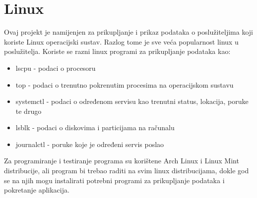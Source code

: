 \documentclass[zavrsnirad]{fer}
\begin{document}
\section{Linux}
Ovaj projekt je namijenjen za prikupljanje i prikaz podataka o poslužiteljima koji koriste Linux operacijski sustav. Razlog tome je sve veća popularnost linux u poslužitelja.
Koriste se razni linux programi za prikupljanje podataka kao:
\begin{itemize}
	\item  lscpu - podaci o procesoru
	\item top - podaci o trenutno pokrenutim procesima na operacijskom sustavu
	\item systemctl - podaci o određenom servisu kao trenutni status, lokacija, poruke te drugo
	\item lsblk -  podaci o diskovima i particijama na računalu
	\item journalctl - poruke koje je određeni servis poslao
\end{itemize}
Za programiranje i testiranje programa su korištene Arch Linux i Linux Mint distribucije, ali program bi trebao raditi na svim linux distribucijama, dokle god se na njih mogu instalirati potrebni programi za prikupljanje podataka i pokretanje aplikacija.
\end{document}
